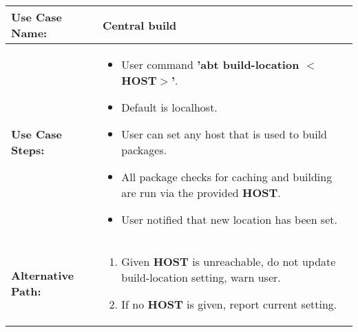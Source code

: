 \medskip

\begin{tabularx}{\linewidth}{|l|X|}
\hline
\textbf{Use Case Name:} & \textbf{Central build} \\
\hline
\textbf{Use Case Steps:} & 
\begin{minipage}{\linewidth} 
  \vspace{0.05em}
  \begin{itemize}
    \item User command \textbf{'abt build-location $<$HOST$>$'}.
    \item Default is localhost.
    \item User can set any host that is used to build packages.
    \item All package checks for caching and building are run via the provided \textbf{HOST}.
    \item User notified that new location has been set.
  \end{itemize}
  \vspace{0.05em}
\end{minipage}
\\
\hline 
\textbf{Alternative Path:} &
\begin{minipage}{\linewidth}
  \vspace{0.05em} 
  \begin{enumerate}
    \item Given \textbf{HOST} is unreachable, do not update build-location setting, warn user.
    \item If no \textbf{HOST} is given, report current setting.
  \end{enumerate}
  \vspace{0.05em} 
\end{minipage}
\\
\hline
\end{tabularx}